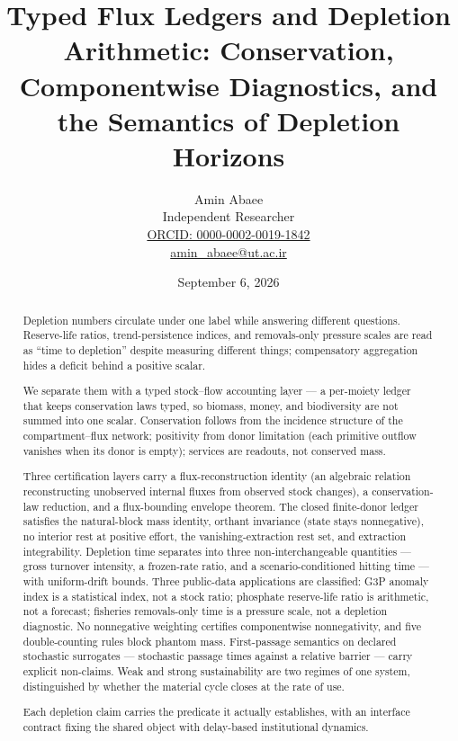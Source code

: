 \documentclass[11pt]{article}
\begin{document}
\title{Typed Flux Ledgers and Depletion Arithmetic: Conservation, Componentwise Diagnostics, and the Semantics of Depletion Horizons}
\author{Amin Abaee\\[0.35em]
{\small Independent Researcher}\\[0.55em]
{\small\href{https://orcid.org/0000-0002-0019-1842}{ORCID: 0000-0002-0019-1842}}\\[0.3em]
{\small\href{mailto:amin\_abaee@ut.ac.ir}{amin\_abaee@ut.ac.ir}}}
\date{September 6, 2026}
\maketitle

\begin{abstract}


Depletion numbers circulate under one label while answering different
questions. Reserve-life ratios, trend-persistence indices, and
removals-only pressure scales are read as ``time to depletion'' despite
measuring different things; compensatory aggregation hides a deficit
behind a positive scalar.

We separate them with a typed stock--flow accounting layer --- a
per-moiety ledger that keeps conservation laws typed, so biomass, money,
and biodiversity are not summed into one scalar. Conservation follows
from the incidence structure of the compartment--flux network;
positivity from donor limitation (each primitive outflow vanishes when
its donor is empty); services are readouts, not conserved mass.

Three certification layers carry a flux-reconstruction identity (an
algebraic relation reconstructing unobserved internal fluxes from
observed stock changes), a conservation-law reduction, and a
flux-bounding envelope theorem. The closed finite-donor ledger satisfies
the natural-block mass identity, orthant invariance (state stays
nonnegative), no interior rest at positive effort, the
vanishing-extraction rest set, and extraction integrability. Depletion
time separates into three non-interchangeable quantities --- gross
turnover intensity, a frozen-rate ratio, and a scenario-conditioned
hitting time --- with uniform-drift bounds. Three public-data
applications are classified: G3P anomaly index is a statistical index,
not a stock ratio; phosphate reserve-life ratio is arithmetic, not a
forecast; fisheries removals-only time is a pressure scale, not a
depletion diagnostic. No nonnegative weighting certifies componentwise
nonnegativity, and five double-counting rules block phantom mass.
First-passage semantics on declared stochastic surrogates --- stochastic
passage times against a relative barrier --- carry explicit non-claims.
Weak and strong sustainability are two regimes of one system,
distinguished by whether the material cycle closes at the rate of use.

Each depletion claim carries the predicate it actually establishes, with
an interface contract fixing the shared object with delay-based
institutional dynamics.

\end{abstract}
\end{document}

